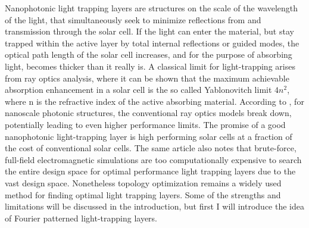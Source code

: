 Nanophotonic light trapping layers are structures on the scale of the wavelength of the light, that simultaneously seek to minimize reflections from and transmission through the solar cell.
If the light can enter the material, but stay trapped within the active layer by total internal reflections or guided modes, the optical path length of the solar cell increases, and for the purpose
of absorbing light, becomes thicker than it really is. A classical limit for light-trapping arises from ray optics analysis,
where it can be shown that the maximum achievable absorption enhancement in a solar cell is the so called Yablonovitch limit $4n^2$, where n is the refractive index of the active absorbing material.
According to \cite{high-index-nanostructures}, for nanoscale photonic structures, the conventional ray optics models break down, potentially leading to even higher performance limits. The promise of a good nanophotonic light-trapping layer is high performing solar cells
at a fraction of the cost of conventional solar cells.
The same article also notes that brute-force, full-field electromagnetic simulations are too computationally expensive to search the entire design space for optimal performance light trapping layers due to the vast design space. 
Nonetheless topology optimization remains a widely used method for finding optimal light trapping layers. Some of the strengths and limitations will be discussed in the introduction, but first I will introduce the idea of Fourier patterned light-trapping layers.

